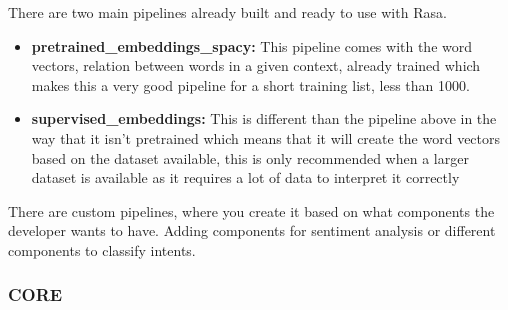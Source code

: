 There are two main pipelines already built and ready to use with Rasa.
\begin{itemize}
	\item {\textbf{pretrained\_embeddings\_spacy:} This pipeline comes with the word vectors, relation between words in a given context, already trained which makes this a very good pipeline for a short training list, less than 1000.}
	\item {\textbf{supervised\_embeddings:} This is different than the pipeline above in the way that it isn’t pretrained which means that it will create the word vectors based on the dataset available, this is only recommended when a larger dataset is available as it requires a lot of data to interpret it correctly
		}
\end{itemize}
There are custom pipelines, where you create it based on what components the developer wants to have. Adding components for sentiment analysis or different components to classify intents.

\subsubsection{CORE}\label{sec:chap3_rasa_core}

